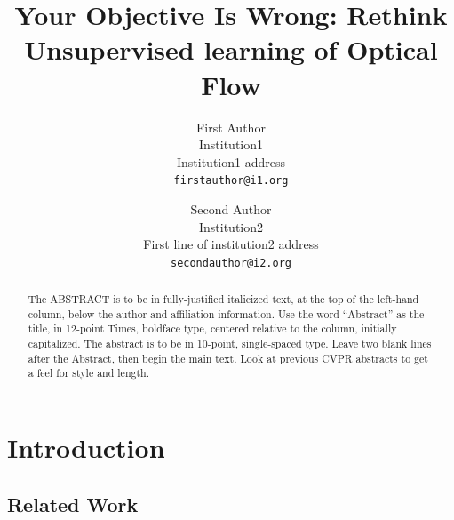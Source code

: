 \documentclass[10pt,twocolumn,letterpaper]{article}
\begin{document}
\title{Your Objective Is Wrong: Rethink Unsupervised learning of Optical Flow}

\author{First Author\\
Institution1\\
Institution1 address\\
{\tt\small firstauthor@i1.org}
\and
Second Author\\
Institution2\\
First line of institution2 address\\
{\tt\small secondauthor@i2.org}
}

\maketitle

\begin{abstract}
   The ABSTRACT is to be in fully-justified italicized text, at the top
   of the left-hand column, below the author and affiliation
   information. Use the word ``Abstract'' as the title, in 12-point
   Times, boldface type, centered relative to the column, initially
   capitalized. The abstract is to be in 10-point, single-spaced type.
   Leave two blank lines after the Abstract, then begin the main text.
   Look at previous CVPR abstracts to get a feel for style and length.
\end{abstract}

\section{Introduction}

\subsection{Related Work}
\end{document}
